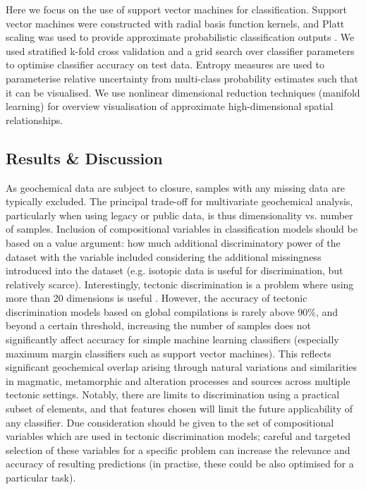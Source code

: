 \documentclass[a4,10pt]{article}
\begin{document}
\begin{multicols*}{2}[]
	Here we focus on the use of support vector machines for classification. Support vector machines were constructed with radial basis function kernels, and Platt scaling was used to provide approximate probabilistic classification outputs \citep[][]{Platt2000, Lin2007}. We used stratified k-fold cross validation and a grid search over classifier parameters to optimise classifier accuracy on test data. Entropy measures are used to parameterise relative uncertainty from multi-class probability estimates such that it can be visualised. We use nonlinear dimensional reduction techniques (manifold learning) for overview visualisation of approximate high-dimensional spatial relationships. 
	
	\subsection*{Results \& Discussion}
	
	As geochemical data are subject to closure, samples with any missing data are typically excluded. The principal trade-off for multivariate geochemical analysis, particularly when using legacy or public data, is thus dimensionality vs. number of samples. Inclusion of compositional variables in classification models should be based on a value argument: how much additional discriminatory power of the dataset with the variable included considering the additional missingness introduced into the dataset (e.g. isotopic data is useful for discrimination, but relatively scarce). Interestingly, tectonic discrimination is a problem where using more than 20 dimensions is useful \citep[][]{Petrelli2016, Ueki2018}. However, the accuracy of tectonic discrimination models based on global compilations is rarely above 90\%, and beyond a certain threshold, increasing the number of samples does not significantly affect accuracy for simple machine learning classifiers (especially maximum margin classifiers such as support vector machines). This reflects significant geochemical overlap arising through natural variations and similarities in magmatic, metamorphic and alteration processes and sources across multiple tectonic settings. Notably, there are limits to discrimination using a practical subset of elements, and that features chosen will limit the future applicability of any classifier. Due consideration should be given to the set of compositional variables which are used in tectonic discrimination models; careful and targeted selection of these variables for a specific problem can increase the relevance and accuracy of resulting predictions (in practise, these could be also optimised for a particular task).
	

\end{multicols*}
\end{document}
